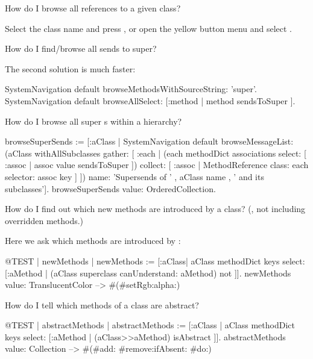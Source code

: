 \documentclass[a4paper,10pt,twoside]{book}
\begin{document}
\begin{faq}
How do I browse all references to a given class?
\end{faq}
\answer
Select the class name and press , or open the yellow button menu and select .

\begin{faq}
How do I find/browse all sends to super?
\end{faq}
\answer
The second solution is much faster:
\begin{code}{}
SystemNavigation default browseMethodsWithSourceString: 'super'.
SystemNavigation default browseAllSelect: [:method | method sendsToSuper ].
\end{code}

\begin{faq}
How do I browse all super s within a hierarchy?
\end{faq}
\answer
\begin{code}{}
browseSuperSends := [:aClass | SystemNavigation default
	browseMessageList: (aClass withAllSubclasses gather: [ :each |
		(each methodDict associations
			select: [ :assoc | assoc value sendsToSuper ])
				collect: [ :assoc | MethodReference class: each selector: assoc key ] ])
	name: 'Supersends of ' , aClass name , ' and its subclasses'].
browseSuperSends value: OrderedCollection.
\end{code}

\begin{faq}
How do I find out which new methods are introduced by a class?
(\ie, not including overridden methods.)
\end{faq}
\answer
Here we ask which methods are introduced by :
\begin{code}{@TEST | newMethods |}
newMethods := [:aClass| aClass methodDict keys select:
	[:aMethod | (aClass superclass canUnderstand: aMethod) not ]].
newMethods value: TranslucentColor --> #(#setRgb:alpha:)
\end{code}

\begin{faq}
How do I tell which methods of a class are abstract?
\end{faq}
\answer
\begin{code}{@TEST | abstractMethods |}
abstractMethods :=
	[:aClass | aClass methodDict keys select:
		[:aMethod | (aClass>>aMethod) isAbstract ]].
abstractMethods value: Collection --> #(#add: #remove:ifAbsent: #do:)
\end{code}
\end{document}
